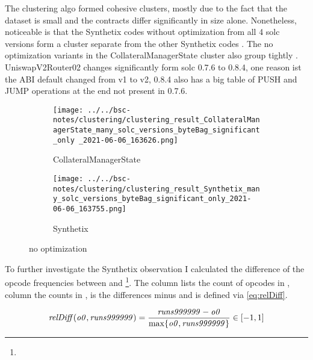 \documentclass[../main.tex]{subfiles}
\begin{document}
The clustering algo formed cohesive clusters, mostly due to the fact that the dataset is small and the contracts differ significantly in size alone.
Nonetheless, noticeable is that the Synthetix codes without optimization from all 4 solc versions form a cluster separate from the other Synthetix codes . The no optimization variants in the CollateralManagerState cluster also group tightly .
UniswapV2Router02 changes significantly form solc 0.7.6 to 0.8.4, one reason ist the ABI default changed from v1 to v2, 0.8.4 also has a big table of PUSH and JUMP operations at the end not present in 0.7.6.

\begin{figure}[ht!]
  \begin{subfigure}[b]{0.5 \linewidth}
    \texttt{[image: ../../bsc-notes/clustering/clustering\_result\_CollateralManagerState\_many\_solc\_versions\_byteBag\_significant\_only \_2021-06-06\_163626.png]}%
    \caption{CollateralManagerState}
    \label{fig:CollateralManagerState}
  \end{subfigure}%
  \begin{subfigure}[b]{0.5 \linewidth}
    \texttt{[image: ../../bsc-notes/clustering/clustering\_result\_Synthetix\_many\_solc\_versions\_byteBag\_significant\_only\_2021-06-06\_163755.png]}
    \caption{Synthetix}
    \label{fig:Synthetix}
  \end{subfigure}
  \caption{no optimization}
\end{figure}

To further investigate the Synthetix observation I calculated the difference of the opcode frequencies between  and  \footnote{}. The column  lists the count of opcodes in , column  the counts in ,  is the differences  minus  and  is defined via \eqref{eq:relDiff}.

\begin{equation}
  \mbox{\textit{relDiff}}(\mbox{\textit{o0}},\mbox{\textit{runs999999}}) = \dfrac{\mbox{\textit{runs999999}} - \mbox{\textit{o0}}}{\max\{\mbox{\textit{o0}}, \mbox{\textit{runs999999}}\}} \in [-1,1]
  \label{eq:relDiff}
\end{equation}
\end{document}

